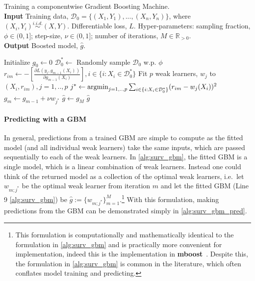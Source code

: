 \documentclass[
  letterpaper,
]{scrbook}
\let\oldparagraph\paragraph
\renewcommand{\paragraph}[1]{\oldparagraph{#1}\mbox{}}
\theoremstyle{plain}
\theoremstyle{definition}
\theoremstyle{remark}
\begin{document}
\begin{algorithm}[H]
\caption{Training a componentwise Gradient Boosting Machine. \\
\textbf{Input} Training data, $\mathcal{D}_0= \{(X_1,Y_1),...,(X_n,Y_n)\}$, where $(X_i,Y_i) \stackrel{i.i.d.}\sim(X,Y)$. Differentiable loss, $L$. Hyper-parameters: sampling fraction, $\phi \in (0,1]$; step-size, $\nu \in  (0,1]$; number of iterations, $M \in \mathbb{R}_{>0}$. \\
\textbf{Output} Boosted model, $\hat{g}$.}\label{alg:surv_gbm}
\begin{algorithmic}[1]
\State Initialize $g_0 \gets 0$
\State $\mathcal{D}_0^* \gets $ Randomly sample $\mathcal{D}_0$ w.p. $\phi$
\State $r_{im} \gets -[\frac{\partial L(y_i, g_{m-1}(X_i))}{\partial g_{m-1}(X_i)}], i \in \{i: X_i \in \mathcal{D}_0^*\}$
\State Fit $p$ weak learners, $w_j$ to $(X_i, r_{im}), j = 1,..,p$
\State $j^* \gets \operatornamewithlimits{argmin}_{j = 1,..,p} \sum_{i \in \{i: X_i \in \mathcal{D}_0^*\}}
(r_{im} - w_j(X_i))^2$
\State $g_m \gets g_{m-1} + \nu w_{j^*}$
\EndFor
\State $\hat{g}\gets g_M$
\Return $\hat{g}$
\end{algorithmic}
\end{algorithm}

\paragraph{Predicting with a GBM}

In general, predictions from a trained GBM are simple to compute as the
fitted model (and all individual weak learners) take the same inputs,
which are passed sequentially to each of the weak learners. In
\ref{alg:surv_gbm}, the fitted GBM is a single model, which is a linear
combination of weak learners. Instead one could think of the returned
model as a collection of the optimal weak learners, i.e.~let
\(w_{m;j^*}\) be the optimal weak learner from iteration \(m\) and let
the fitted GBM (Line 9 \ref{alg:surv_gbm}) be
\(\hat{g}:= \{w_{m;j^*}\}^M_{m=1}\).\footnote{This formulation is computationally and mathematically identical to the formulation in \ref{alg:surv_gbm} and is practically more convenient for implementation, indeed this is the implementation in \textbf{mboost}~\cite{pkgmboost}. Despite this, the formulation in \ref{alg:surv_gbm} is common in the literature, which often conflates model training and predicting.}
With this formulation, making predictions from the GBM can be
demonstrated simply in \ref{alg:surv_gbm_pred}.
\end{document}
